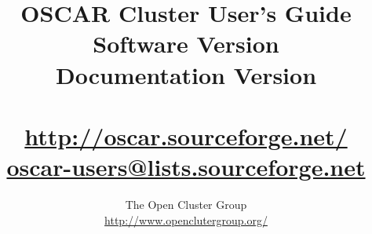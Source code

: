 %
%
%

\title{OSCAR Cluster User's Guide \\
Software Version \oscarversion \\
Documentation Version \docsversion \\
\ \\
\url{http://oscar.sourceforge.net/} \\
\href{mailto:oscar-users@lists.sourceforge.net}{oscar-users@lists.sourceforge.net}}

\author{The Open Cluster Group \\
\url{http://www.openclutergroup.org/}}
\maketitle
